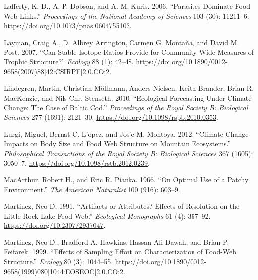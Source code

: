 \documentclass{article}
\begin{document}
\leavevmode\hypertarget{ref-laffertyParasitesDominateFood2006}{}%
Lafferty, K. D., A. P. Dobson, and A. M. Kuris. 2006. ``Parasites
Dominate Food Web Links.'' \emph{Proceedings of the National Academy of
Sciences} 103 (30): 11211--6.
\url{https://doi.org/10.1073/pnas.0604755103}.

\leavevmode\hypertarget{ref-laymanCanStableIsotope2007}{}%
Layman, Craig A., D. Albrey Arrington, Carmen G. Montaña, and David M.
Post. 2007. ``Can Stable Isotope Ratios Provide for Community-Wide
Measures of Trophic Structure?'' \emph{Ecology} 88 (1): 42--48.
\href{https://doi.org/10.1890/0012-9658(2007)88\%5B42:CSIRPF\%5D2.0.CO;2}{https://doi.org/10.1890/0012-9658(2007)88{[}42:CSIRPF{]}2.0.CO;2}.

\leavevmode\hypertarget{ref-lindegrenEcologicalForecastingClimate2010}{}%
Lindegren, Martin, Christian Möllmann, Anders Nielsen, Keith Brander,
Brian R. MacKenzie, and Nils Chr. Stenseth. 2010. ``Ecological
Forecasting Under Climate Change: The Case of Baltic Cod.''
\emph{Proceedings of the Royal Society B: Biological Sciences} 277
(1691): 2121--30. \url{https://doi.org/10.1098/rspb.2010.0353}.

\leavevmode\hypertarget{ref-lurgiClimateChangeImpacts2012}{}%
Lurgi, Miguel, Bernat C. L\a'opez, and Jos\a'e M. Montoya. 2012.
``Climate Change Impacts on Body Size and Food Web Structure on Mountain
Ecosystems.'' \emph{Philosophical Transactions of the Royal Society B:
Biological Sciences} 367 (1605): 3050--7.
\url{https://doi.org/10.1098/rstb.2012.0239}.

\leavevmode\hypertarget{ref-macarthurOptimalUsePatchy1966}{}%
MacArthur, Robert H., and Eric R. Pianka. 1966. ``On Optimal Use of a
Patchy Environment.'' \emph{The American Naturalist} 100 (916): 603--9.

\leavevmode\hypertarget{ref-martinezArtifactsAttributesEffects1991}{}%
Martinez, Neo D. 1991. ``Artifacts or Attributes? Effects of Resolution
on the Little Rock Lake Food Web.'' \emph{Ecological Monographs} 61 (4):
367--92. \url{https://doi.org/10.2307/2937047}.

\leavevmode\hypertarget{ref-martinezEffectsSamplingEffort1999}{}%
Martinez, Neo D., Bradford A. Hawkins, Hassan Ali Dawah, and Brian P.
Feifarek. 1999. ``Effects of Sampling Effort on Characterization of
Food-Web Structure.'' \emph{Ecology} 80 (3): 1044--55.
\href{https://doi.org/10.1890/0012-9658(1999)080\%5B1044:EOSEOC\%5D2.0.CO;2}{https://doi.org/10.1890/0012-9658(1999)080{[}1044:EOSEOC{]}2.0.CO;2}.
\end{document}
